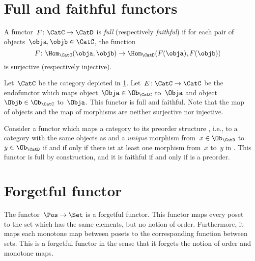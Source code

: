 

\section{Full and faithful functors}
\begin{ctdefinition}
  \label{def:functorfullfaith}
  A functor~$F\colon \CatC \to \CatD$ is \emph{full} (respectively \emph{faithful}) if for each pair of objects~$\obja,\objb\in \CatC$, the function
  \begin{equation}
    F\colon \Hom_\CatC(\obja,\objb)\to \Hom_\CatD(F(\obja),F(\objb))
  \end{equation}
  is surjective (respectively injective).
\end{ctdefinition}

\begin{example}
  Let~$\CatC$ be the category depicted in \cref{fig:ex_full_faithful_1}. Let~$E\colon \CatC\to \CatC$ be the endofunctor which maps object~$\Obja\in \Ob_{\CatC}$ to~$\Obja$ and object~$\Objb\in \Ob_{\CatC}$ to~$\Obja$. This functor is full and faithful. Note that the map of objects and the map of morphisms are neither surjective nor injective.

  \begin{figure}[h!]
    \centering
    \caption{\label{fig:ex_full_faithful_1}}
  \end{figure}
\end{example}

\begin{example}
  Consider a functor which maps a category \CatC to its preorder structure \CatD, i.e., to a category with the same objects as \CatC and a \emph{unique} morphism from~$x\in \Ob_\CatD$ to~$y\in \Ob_\CatD$ if and if only if there ist at least one morphism from~$x$ to~$y$ in \CatC. This functor is full by construction, and it is faithful if and only if \CatC is a preorder.
\end{example}


\section{Forgetful functor}


\begin{example}
  The functor~$\Pos \to \Set$ is a forgetful functor. This functor maps every poset to the set which has the same elements, but no notion of order. Furthermore, it maps each monotone map between posets to the corresponding function between sets. This is a forgetful functor in the sense that it forgets the notion of order and monotone maps.
\end{example}

